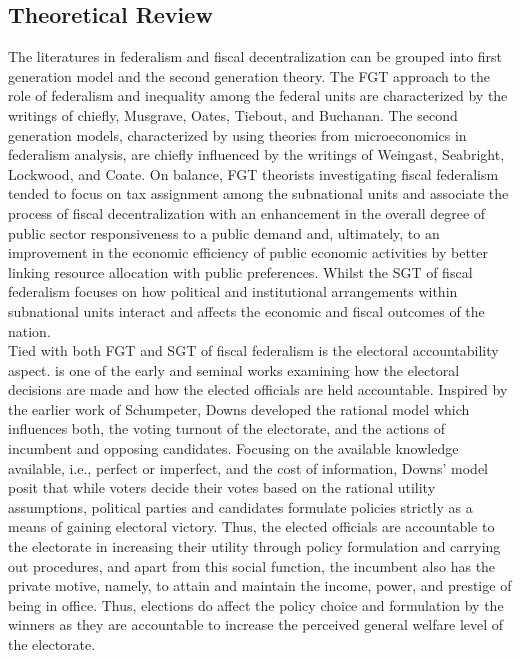\subsection{Theoretical Review} \vspace{-3mm}
The literatures in federalism and fiscal decentralization can be grouped into first generation model and the second generation theory. The FGT approach to the role of federalism and inequality among the federal units are characterized by the writings of chiefly, Musgrave, Oates, Tiebout, and Buchanan. The second generation models, characterized by using theories from microeconomics in federalism analysis, are chiefly influenced by the writings of Weingast, Seabright, Lockwood, and  Coate. On balance, FGT theorists investigating fiscal federalism tended to focus on tax assignment among the subnational units and associate the process of fiscal decentralization with an enhancement in the overall degree of public sector responsiveness to a public demand and, ultimately, to an improvement in the economic efficiency of public economic activities by better linking resource allocation with public preferences. Whilst the SGT of fiscal federalism focuses on how political and institutional arrangements within subnational units interact and affects the economic and fiscal outcomes of the nation. \\
Tied with both FGT and SGT of fiscal federalism is the electoral accountability aspect.  is one of the early and  seminal works examining how the electoral decisions are made and how the elected officials are held accountable. Inspired by the earlier work of Schumpeter, Downs developed the rational model which influences both, the voting turnout of the electorate, and the actions of incumbent and opposing candidates. Focusing on the available knowledge available, i.e., perfect or imperfect, and the cost of information, Downs' model posit that while voters decide their votes based on the rational utility assumptions, political parties and candidates formulate policies strictly as a means of gaining electoral victory. Thus, the elected officials are accountable to the electorate in increasing their utility through policy formulation and carrying out procedures, and apart from this social function, the incumbent also has the private motive, namely, to attain and maintain the income, power, and prestige of being in office. Thus, elections do affect the policy choice and  formulation by the winners as they are accountable to increase the perceived general welfare level of the electorate. \\
